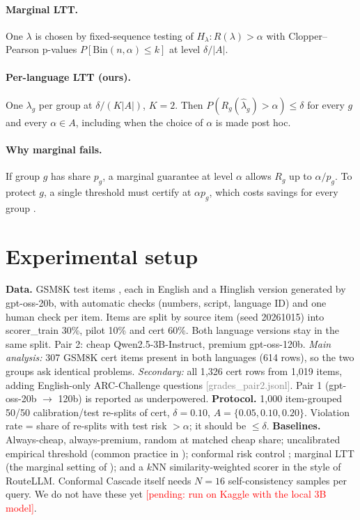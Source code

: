 \documentclass[11pt]{article}
\newcommand{\pending}[1]{\textcolor{red}{[pending: #1]}}
\newcommand{\src}[1]{\textcolor{gray}{\footnotesize[#1]}}
\begin{document}
\paragraph{Marginal LTT.} One $\lambda$ is chosen by fixed-sequence testing of
$H_\lambda: R(\lambda)>\alpha$ with Clopper--Pearson p-values
$P[\mathrm{Bin}(n,\alpha)\le k]$ \citep{clopper1934} at level $\delta/|A|$.
\paragraph{Per-language LTT (ours).} One $\lambda_g$ per group at $\delta/(K|A|)$, $K=2$.
Then $P(R_g(\hat\lambda_g)>\alpha)\le\delta$ for every $g$ and every $\alpha\in A$,
including when the choice of $\alpha$ is made post hoc.
\paragraph{Why marginal fails.} If group $g$ has share $p_g$, a marginal guarantee at level
$\alpha$ allows $R_g$ up to $\alpha/p_g$. To protect $g$, a single threshold must certify at
$\alpha p_g$, which costs savings for every group
\citep[cf.][]{rahman2026rolestratified}.

\section{Experimental setup}
\textbf{Data.} GSM8K test items \citep{cobbe2021gsm8k}, each in English and a Hinglish
version generated by gpt-oss-20b, with automatic checks (numbers, script, language ID)
and one human check per item. Items are split by source item (seed 20261015) into
scorer\_train 30\%, pilot 10\% and cert 60\%. Both language versions stay in the same split.
Pair 2: cheap Qwen2.5-3B-Instruct, premium gpt-oss-120b.
\emph{Main analysis:} 307 GSM8K cert items present in both languages (614 rows), so the two
groups ask identical problems. \emph{Secondary:} all 1{,}326 cert rows from 1{,}019 items,
adding English-only ARC-Challenge questions \src{grades\_pair2.jsonl}. Pair 1 (gpt-oss-20b $\to$ 120b) is
reported as underpowered.
\textbf{Protocol.} 1{,}000 item-grouped 50/50 calibration/test re-splits of cert,
$\delta=0.10$, $A=\{0.05,0.10,0.20\}$. Violation rate = share of re-splits with test
risk $>\alpha$; it should be $\le\delta$.
\textbf{Baselines.} Always-cheap, always-premium, random at matched cheap share;
uncalibrated empirical threshold (common practice in \citealp{ding2024hybrid,ong2024routellm});
conformal risk control \citep{angelopoulos2024crc}; marginal LTT (the marginal setting of
\citealp{dou2026conformalcascade}); and a $k$NN similarity-weighted scorer in the style of RouteLLM.
Conformal Cascade itself needs $N=16$ self-consistency samples per query. We do not have
these yet \pending{run on Kaggle with the local 3B model}.
\end{document}
